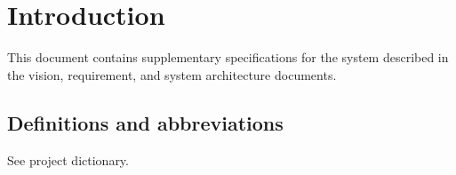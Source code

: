 
\section{Introduction}

This document contains supplementary specifications for the system described in
the vision, requirement, and system architecture documents. 

\subsection{Definitions and abbreviations}
See project dictionary.
